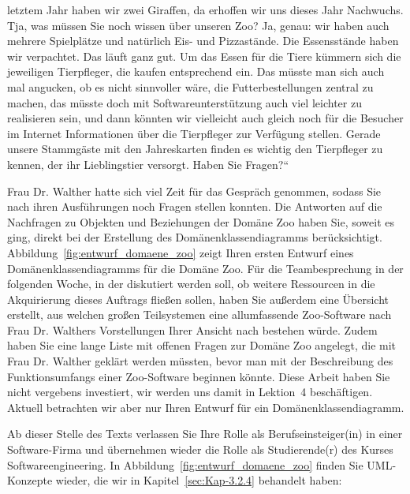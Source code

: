 letztem Jahr haben wir zwei Giraffen, da erhoffen wir uns dieses Jahr Nachwuchs. Tja, was müssen Sie noch wissen über unseren Zoo? Ja, genau: wir haben auch mehrere Spielplätze und natürlich Eis- und Pizzastände. Die Essensstände haben wir verpachtet. Das läuft ganz gut. Um das Essen für die Tiere kümmern sich die jeweiligen Tierpfleger, die kaufen entsprechend ein. Das müsste man sich auch mal angucken, ob es nicht sinnvoller wäre, die Futterbestellungen zentral zu machen, das müsste doch mit Softwareunterstützung auch viel leichter zu realisieren sein, und dann könnten wir vielleicht auch gleich noch für die Besucher im Internet Informationen über die Tierpfleger zur Verfügung stellen. Gerade unsere Stammgäste mit den Jahreskarten finden es wichtig den Tierpfleger zu kennen, der ihr Lieblingstier versorgt. Haben Sie Fragen?“ 

Frau Dr. Walther hatte sich viel Zeit für das Gespräch genommen, sodass Sie nach ihren Ausführungen noch Fragen stellen konnten. Die Antworten auf die Nachfragen zu Objekten und Beziehungen der Domäne Zoo haben Sie, soweit es ging, direkt bei der Erstellung des Domänenklassendiagramms berücksichtigt. Abbildung~\ref{fig:entwurf_domaene_zoo} zeigt Ihren ersten Entwurf eines Domänenklassendiagramms für die Domäne Zoo. Für die Teambesprechung in der folgenden Woche, in der diskutiert werden soll, ob weitere Ressourcen in die Akquirierung dieses Auftrags fließen sollen, haben Sie außerdem eine Übersicht erstellt, aus welchen großen Teilsystemen eine allumfassende Zoo-Software nach Frau Dr. Walthers Vorstellungen Ihrer Ansicht nach bestehen würde. Zudem haben Sie eine lange Liste mit offenen Fragen zur Domäne Zoo angelegt, die mit Frau Dr. Walther geklärt werden müssten, bevor man mit der Beschreibung des Funktionsumfangs einer Zoo-Software beginnen könnte. Diese Arbeit haben Sie nicht vergebens investiert, wir werden uns damit in Lektion~4 %
beschäftigen. Aktuell betrachten wir aber nur Ihren Entwurf für ein Domänenklassendiagramm.


Ab dieser Stelle des Texts verlassen Sie Ihre Rolle als Berufseinsteiger(in) in einer Software-Firma und übernehmen wieder die Rolle als Studierende(r) des Kurses Softwareengineering. In Abbildung~\ref{fig:entwurf_domaene_zoo} finden Sie UML-Konzepte wieder, die wir in Kapitel~\ref{sec:Kap-3.2.4} behandelt haben:


